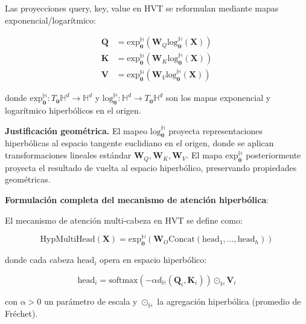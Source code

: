 \begin{definition}\label{def:hvt_projections}
Las proyecciones query, key, value en HVT se reformulan mediante mapas exponencial/logarítmico:

\begin{align}
    \mathbf{Q} &= \text{exp}_{\mathbf{0}}^{\mathbb{H}}(\mathbf{W}_Q \text{log}_{\mathbf{0}}^{\mathbb{H}}(\mathbf{X})) \\
    \mathbf{K} &= \text{exp}_{\mathbf{0}}^{\mathbb{H}}(\mathbf{W}_K \text{log}_{\mathbf{0}}^{\mathbb{H}}(\mathbf{X})) \\
    \mathbf{V} &= \text{exp}_{\mathbf{0}}^{\mathbb{H}}(\mathbf{W}_V \text{log}_{\mathbf{0}}^{\mathbb{H}}(\mathbf{X}))
    \label{eq:hyperbolic_projections}
\end{align}

donde $\text{exp}_{\mathbf{0}}^{\mathbb{H}}: T_{\mathbf{0}}\mathbb{H}^d \to \mathbb{H}^d$ y $\text{log}_{\mathbf{0}}^{\mathbb{H}}: \mathbb{H}^d \to T_{\mathbf{0}}\mathbb{H}^d$ son los mapas exponencial y logarítmico hiperbólicos en el origen.
\end{definition}

\textbf{Justificación geométrica.}\label{rem:hvt_geometry} El mapeo $\text{log}_{\mathbf{0}}^{\mathbb{H}}$ proyecta representaciones hiperbólicas al espacio tangente euclidiano en el origen, donde se aplican transformaciones lineales estándar $\mathbf{W}_Q, \mathbf{W}_K, \mathbf{W}_V$. El mapa $\text{exp}_{\mathbf{0}}^{\mathbb{H}}$ posteriormente proyecta el resultado de vuelta al espacio hiperbólico, preservando propiedades geométricas.

\textbf{Formulación completa del mecanismo de atención hiperbólica}:

\begin{definition}\label{def:hvt_multihead}
El mecanismo de atención multi-cabeza en HVT se define como:

\begin{equation}
\text{HypMultiHead}(\mathbf{X}) = \text{exp}_{\mathbf{0}}^{\mathbb{H}}\left(\mathbf{W}_O \text{Concat}(\text{head}_1, \ldots, \text{head}_h)\right)
\label{eq:hvt_multihead}
\end{equation}

donde cada cabeza $\text{head}_i$ opera en espacio hiperbólico:

\begin{equation}
\text{head}_i = \text{softmax}\left(-\alpha d_{\mathbb{H}}(\mathbf{Q}_i, \mathbf{K}_i)\right) \odot_{\mathbb{H}} \mathbf{V}_i
\label{eq:hvt_head}
\end{equation}

con $\alpha > 0$ un parámetro de escala y $\odot_{\mathbb{H}}$ la agregación hiperbólica (promedio de Fréchet).
\end{definition}

